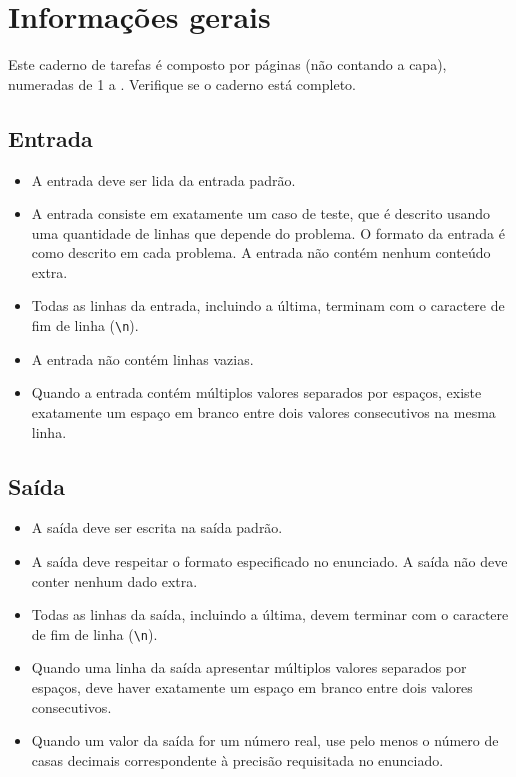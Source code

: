 \section*{Informações gerais}

Este caderno de tarefas é composto por \pageref*{lastpage} páginas (não
contando a capa), numeradas 
de 1 a \pageref*{lastpage}. Verifique se o caderno está completo.

\subsection*{Entrada}

\begin{itemize}
	\item A entrada deve ser lida da entrada padrão.

	\item A entrada consiste em exatamente um caso de teste, que é descrito usando uma
	quantidade de linhas que depende do problema. O formato da entrada é como descrito
	em cada problema. A entrada não contém nenhum conteúdo extra.

	\item Todas as linhas da entrada, incluindo a última, terminam com o caractere de fim
	de linha (\texttt{\textbackslash n}).

	\item A entrada não contém linhas vazias.

	\item Quando a entrada contém múltiplos valores separados por espaços, 
	existe exatamente um espaço em branco entre dois valores consecutivos na mesma linha.
\end{itemize}

\subsection*{Saída}

\begin{itemize}
	\item A saída deve ser escrita na saída padrão.

	\item A saída deve respeitar o formato especificado no enunciado. A saída não deve
	conter nenhum dado extra.

	\item Todas as linhas da saída, incluindo a última, devem terminar com o caractere de fim
	de linha (\texttt{\textbackslash n}).

	\item Quando uma linha da saída apresentar múltiplos valores separados por espaços, deve haver
	exatamente um espaço em branco entre dois valores consecutivos.

	\item Quando um valor da saída for um número real, use pelo menos o número de casas decimais correspondente
	à precisão requisitada no enunciado.
\end{itemize}


